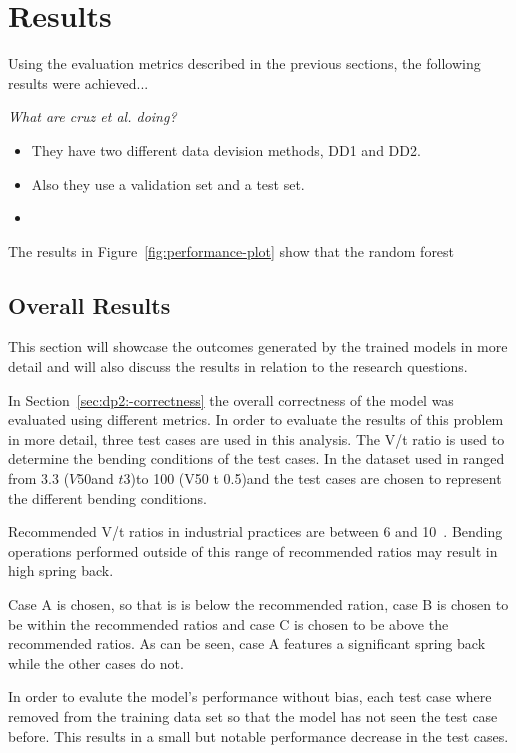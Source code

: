 \section{Results}\label{sec:overall-results}
Using the evaluation metrics described in the previous sections, the
following results were
achieved...

\textit{What are cruz et al. doing?}
\begin{itemize}
    \item They have two different data devision methods, DD1 and DD2.
    \item Also they use a validation set and a test set.
    \item
\end{itemize}

The results in Figure~\ref{fig:performance-plot} show that the random forest

\subsection{Overall Results}\label{subsec:overall-results}
This section will showcase the outcomes generated by the trained models in more detail and
will also discuss the results in relation to the research questions.

In Section~\ref{sec:dp2:-correctness} the overall correctness of the model was
evaluated using different metrics.
In order to evaluate the results of this problem in more detail, three test cases are used
in this analysis.
The V/t ratio is used to determine the bending conditions of the test cases. In the
dataset used in ranged from 3.3 (\(V 50\)and \(t 3\))to 100 (V50 t 0.5)and the test
cases are chosen to represent the different bending conditions.

Recommended V/t ratios in industrial practices are between 6 and 10~\cite[p.7]{
    cruz_applicationmachinelearning_2021}.
Bending operations performed outside of this range of recommended ratios may result in
high spring back.

Case A is chosen, so that is is below the recommended ration, case B is chosen to be
within the recommended ratios and case C is chosen to be above the recommended ratios.
As can be seen, case A features a significant spring back while the other cases do not.

In order to evalute the model's performance without bias, each test case where removed
from
the training data set so that the model has not seen the test case before.
This results in a small but notable performance decrease in the test cases.
%

